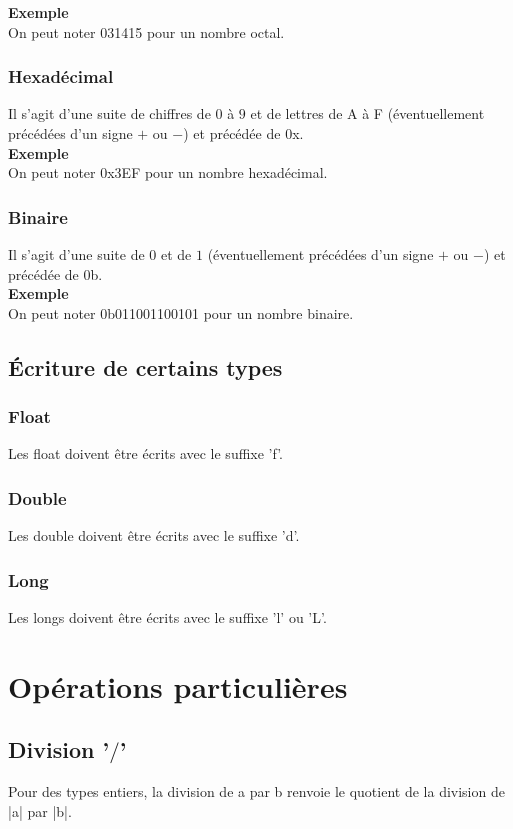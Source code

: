 \documentclass[a4paper,10pt]{book}
\begin{document}
\textbf{Exemple}\\
On peut noter 031415 pour un nombre octal.

\subsubsection{Hexadécimal}
Il s'agit d'une suite de chiffres de $0$ à $9$ et de lettres de A à F (éventuellement précédées d'un signe $+$ ou $-$) et précédée de $0$x.\\

\textbf{Exemple}\\
On peut noter 0x3EF pour un nombre hexadécimal.

\subsubsection{Binaire}
Il s'agit d'une suite de $0$ et de $1$ (éventuellement précédées d'un signe $+$ ou $-$) et précédée de $0$b.\\

\textbf{Exemple}\\
On peut noter 0b011001100101 pour un nombre binaire. 

\subsection{Écriture de certains types}
\subsubsection{Float}
Les float doivent être écrits avec le suffixe 'f'.

\subsubsection{Double}
Les double doivent être écrits avec le suffixe 'd'.

\subsubsection{Long}
Les longs doivent être écrits avec le suffixe 'l' ou 'L'.

\newpage

\section{Opérations particulières}
\subsection{Division '$/$'}
Pour des types entiers, la division de a par b renvoie le quotient de la division de |a| par |b|.
\end{document}
